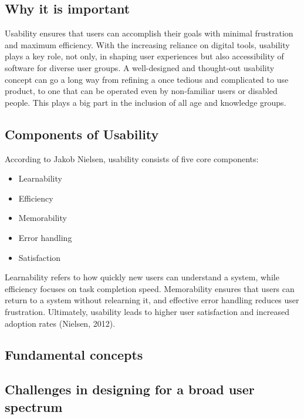 \subsection{Why it is important}

Usability ensures that users can accomplish their goals with minimal frustration and maximum efficiency. With the increasing reliance on digital tools, usability plays a key role, not only, in shaping user experiences but also accessibility of software for diverse user groups. A well-designed and thought-out usability concept can go a long way from refining a once tedious and complicated to use product, to one that can be operated even by non-familiar users or disabled people. This plays a big part in the inclusion of all age and knowledge groups.

\subsection{Components of Usability}

According to Jakob Nielsen, usability consists of five core components:

\begin{itemize}
    \item Learnability
    
    \item Efficiency

    \item Memorability
    \item Error handling
    \item Satisfaction
\end{itemize}
Learnability refers to how quickly new users can understand a system, while efficiency focuses on task completion speed. Memorability ensures that users can return to a system without relearning it, and effective error handling reduces user frustration. Ultimately, usability leads to higher user satisfaction and increased adoption rates (Nielsen, 2012).

\subsection{Fundamental concepts}

\subsection{Challenges in designing for a broad user spectrum}

\newpage